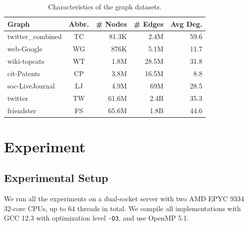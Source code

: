 




\begin{table}[t]
    \centering
    \caption{Characteristics of the graph datasets.}
    \setlength{\tabcolsep}{8.8pt}
    \begin{tabular}{l c r r r}
        \toprule
        \textbf{Graph}
        & \textbf{Abbr.}
        & \textbf{\# Nodes}
        & \textbf{\# Edges}
        & \textbf{Avg Deg.} \\
        \midrule
        twitter\_combined  & TC  & 81.3K       & 2.4M           & 59.6  \\
        web-Google         & WG  & 876K        & 5.1M           & 11.7  \\
        wiki-topcats       & WT  & 1.8M        & 28.5M          & 31.8  \\
        cit-Patents        & CP  & 3.8M        & 16.5M          & 8.8   \\
        soc-LiveJournal   & LJ  & 4.9M        & 69M            & 28.5  \\
        twitter            & TW  & 61.6M       & 2.4B           & 35.3  \\
        friendster         & FS  & 65.6M       & 1.8B           & 44.6  \\
        \bottomrule
    \end{tabular}
    \label{tab:dataset_characteristics}
 
\end{table}


\section{Experiment}
\label{sec:experiment}
\subsection{Experimental Setup}

We run all the experiments on a dual-socket server with two AMD EPYC 9334 32-core CPUs, up to 64 threads in total.
We compile all implementations with GCC 12.3 with optimization level \texttt{-O3}, and use OpenMP 5.1.


